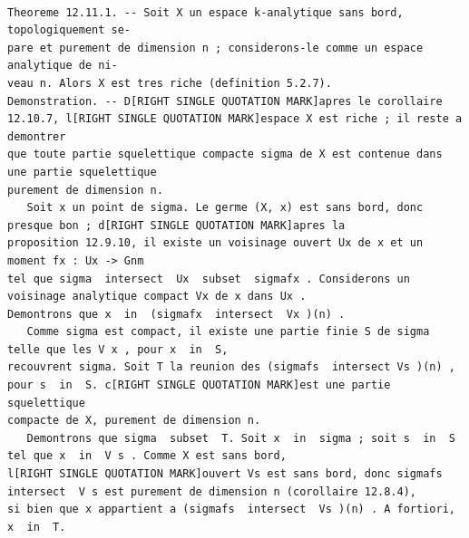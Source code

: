 \documentclass[
  11pt,
]{article}
\begin{document}
\begin{lstlisting}

Theoreme 12.11.1. -- Soit X un espace k-analytique sans bord, topologiquement se-
pare et purement de dimension n ; considerons-le comme un espace analytique de ni-
veau n. Alors X est tres riche (definition 5.2.7).
Demonstration. -- D[RIGHT SINGLE QUOTATION MARK]apres le corollaire 12.10.7, l[RIGHT SINGLE QUOTATION MARK]espace X est riche ; il reste a demontrer
que toute partie squelettique compacte sigma de X est contenue dans une partie squelettique
purement de dimension n.
   Soit x un point de sigma. Le germe (X, x) est sans bord, donc presque bon ; d[RIGHT SINGLE QUOTATION MARK]apres la
proposition 12.9.10, il existe un voisinage ouvert Ux de x et un moment fx : Ux -> Gnm
tel que sigma  intersect  Ux  subset  sigmafx . Considerons un voisinage analytique compact Vx de x dans Ux .
Demontrons que x  in  (sigmafx  intersect  Vx )(n) .
   Comme sigma est compact, il existe une partie finie S de sigma telle que les V x , pour x  in  S,
recouvrent sigma. Soit T la reunion des (sigmafs  intersect Vs )(n) , pour s  in  S. c[RIGHT SINGLE QUOTATION MARK]est une partie squelettique
compacte de X, purement de dimension n.
   Demontrons que sigma  subset  T. Soit x  in  sigma ; soit s  in  S tel que x  in  V s . Comme X est sans bord,
l[RIGHT SINGLE QUOTATION MARK]ouvert Vs est sans bord, donc sigmafs  intersect  V s est purement de dimension n (corollaire 12.8.4),
si bien que x appartient a (sigmafs  intersect  Vs )(n) . A fortiori, x  in  T.


\end{lstlisting}
\end{document}

